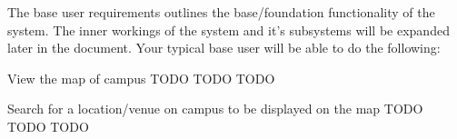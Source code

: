 The base user requirements outlines the base/foundation functionality of the system. The inner workings of the system and it's subsystems will be expanded later in the document. Your typical base user will be able to do the following:

\FuncReq
{View the map of campus}
{TODO}
{TODO}
{TODO}

\FuncReq
{Search for a location/venue on campus to be displayed on the map}
{TODO}
{TODO}
{TODO}
